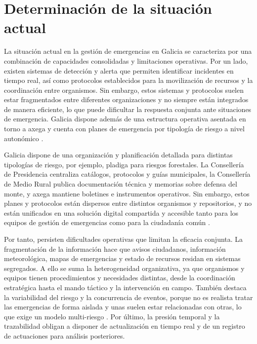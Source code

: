 \section{Determinación de la situación actual}
\label{sec:actual}

La situación actual en la gestión de emergencias en Galicia se caracteriza por una combinación de capacidades consolidadas y limitaciones operativas. Por un lado, existen sistemas de detección y alerta que permiten identificar incidentes en tiempo real, así como protocolos establecidos para la movilización de recursos y la coordinación entre organismos. Sin embargo, estos sistemas y protocolos suelen estar fragmentados entre diferentes organizaciones y no siempre están integrados de manera eficiente, lo que puede dificultar la respuesta conjunta ante situaciones de emergencia. Galicia dispone además de una estructura operativa asentada en torno a \acrfull{axega} y cuenta con planes de emergencia por tipología de riesgo a nivel autonómico \cite{AxegaPortal,PlansEmerxenciaGalicia}.

Galicia dispone de una organización y planificación detallada para distintas tipologías de riesgo, por ejemplo, \acrfull{pladiga} para riesgos forestales. La Consellería de Presidencia centraliza catálogos, protocolos y guías municipales, la Consellería de Medio Rural publica documentación técnica y memorias sobre defensa del monte, y \acrshort{axega} mantiene boletines e instrumentos operativos. Sin embargo, estos planes y protocolos están dispersos entre distintos organismos y repositorios, y no están unificados en una solución digital compartida y accesible tanto para los equipos de gestión de emergencias como para la ciudadanía común \cite{PlansEmerxenciaGalicia,PladigaXunta2026,AxegaPortal}.

Por tanto, persisten dificultades operativas que limitan la eficacia conjunta. La fragmentación de la información hace que avisos ciudadanos, información meteorológica, mapas de emergencias y estado de recursos residan en sistemas segregados. A ello se suma la heterogeneidad organizativa, ya que organismos y equipos tienen procedimientos y necesidades distintas, desde la coordinación estratégica hasta el mando táctico y la intervención en campo. También destaca la variabilidad del riesgo y la concurrencia de eventos, porque no es realista tratar las emergencias de forma aislada y unas suelen estar relacionadas con otras, lo que exige un modelo multi-riesgo \cite{PlansEmerxenciaGalicia,AxegaAlertaChuvia2026}. Por último, la presión temporal y la trazabilidad obligan a disponer de actualización en tiempo real y de un registro de actuaciones para análisis posteriores.

